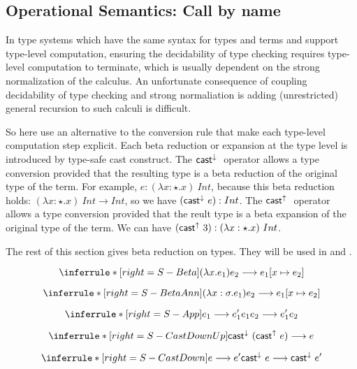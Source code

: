 

\subsection{Operational Semantics: Call by name}

In type systems which have the same syntax for types and terms and support type-level computation, ensuring the decidability of type checking requires type-level computation to terminate, which is usually dependent on the strong normalization of the calculus. An unfortunate consequence of coupling decidability of type checking and strong normaliation is adding (unrestricted) general recursion to such calculi is difficult.

So here use an alternative to the conversion rule that make each type-level computation step explicit. Each beta reduction or expansion at the type level is introduced by type-safe cast construct. The $\mathsf{cast}^{\downarrow}\ $ operator allows a type conversion provided that the resulting type is a beta reduction of the original type of the term. For example, $e: (\lambda x:\star. x)\ Int$, because this beta reduction holds: $(\lambda x:\star. x)\ Int \longrightarrow Int$, so we have $(\mathsf{cast}^{\downarrow}\  e) : Int$. The $\mathsf{cast}^{\uparrow}\ $ operator allows a type conversion provided that the reult type is a beta expansion of the original type of the term. We can have $(\mathsf{cast}^{\uparrow}\  3):(\lambda x:\star. x)\ Int$.

The rest of this section gives beta reduction on types. They will be used in \castupe and \castdowne.

\[
\inferrule*[right=S-Beta]
{  }
{ (\lambda x. e_1) e_2 \longrightarrow e_1 [x\mapsto e_2] }
\]

\[
\inferrule*[right=S-BetaAnn]
{  }
{ (\lambda x:\sigma. e_1) e_2 \longrightarrow e_1 [x\mapsto e_2] }
\]

\[
\inferrule*[right=S-App]
{ e_1 \longrightarrow e_1'  }
{ e_1 e_2 \longrightarrow e_1' e_2}
\]

\[
\inferrule*[right=S-CastDownUp]
{  }
{ \castdowne (\castupe e)  \longrightarrow e }
\]

\[
\inferrule*[right=S-CastDown]
{ e \longrightarrow e' }
{ \castdowne  e  \longrightarrow  \castdowne  e' }
\]

